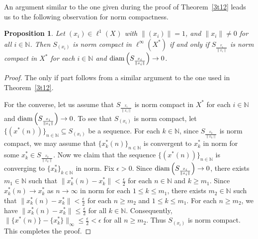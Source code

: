 \documentclass[12pt]{amsart}
\newtheorem{proposition}[theorem]{Proposition}
\theoremstyle{definition}
\numberwithin{equation}{section}
\begin{document}
 An argument similar to the one given during the proof of Theorem~\ref{3t12} leads us to the following observation for norm compactness.
\begin{proposition}\label{3c4}
Let $ (x_i) \in {{\ell^{1}}}(X_{})$ with $ \| (x_i) \| = 1 $, and $ \|x_{i}\|\neq 0$ for all $i\in{\mathbb{N}}$. Then $S_{(x_i)}$ is norm compact in $ {{\ell^{\infty}}}(X_{}^*) $ if and only if $S_{\frac{x_i}{\|x_i\|}} $ is norm compact in $X_{}^*$ for each $i\in{\mathbb{N}}$ and $ \textup{diam}\left(S_{\frac{x_i}{\|x_i\|}}\right) \to 0 $.
\end{proposition}

\begin{proof}
 The only if part follows from a similar argument to the one  used in Theorem~\ref{3t12}.

For the converse, let us assume that $S_{\frac{x_i}{\|x_i\|}} $ is norm compact in $X_{}^*$ for each $i\in{\mathbb{N}}$ and  $\textup{diam}\left(S_{\frac{x_i}{\|x_i\|}}\right) \to 0$. To see that  $S_{(x_i)}$ is norm compact, let $\{(x^*(n))\}_{n\in\mathbb{N}} \subseteq S_{(x_i)}$ be a sequence. For each $k\in \mathbb{N}$, since $S_{\frac{x_k}{\|x_k\|}}$ is norm compact, we may assume that $\{x^*_{k}(n)\}_{n\in \mathbb{N}}$ is convergent to $x_{k}^*$ in norm for some $x_{k}^*\in S_{\frac{x_{k}}{\|x_{k}\|}}$. Now we claim that the sequence $\{(x^*(n))\}_{n\in\mathbb{N}}$ is converging to $\{x_{k}^*\}_{k\in\mathbb{N}}$ in norm. Fix $\epsilon>0$. Since $\textup{diam}\left(S_{\frac{x_i}{\|x_i\|}}\right) \to 0$, there exists  $m_{1}\in \mathbb{N}$ such that $\|x_{k}^*(n)-x_{k}^*\|<\frac{\epsilon}{2}$ for each $n\in \mathbb{N}$ and $k\geq m_{1}$. Since $x_{k}^*(n)\to x_{k}^*$ as $n\to \infty$ in norm for each $1\leq k\leq m_{1}$, there exists $m_{2}\in\mathbb{N}$ such that $\|x_{k}^*(n)-x_{k}^*\|<\frac{\epsilon}{2}$ for each $n\geq m_{2}$ and $1\leq k\leq m_{1}$. For each $n\geq m_{2}$, we have $\|x_{k}^*(n)-x_{k}^*\|\leq \frac{\epsilon}{2}$ for all $k\in \mathbb{N}$. Consequently, $\|\{x^*(n)\}-\{x_{k}^*\}\|_{\infty}\leq \frac{\epsilon}{2}<\epsilon$ for all $n\geq m_{2}$. Thus $S_{(x_{i})}$ is norm compact. This completes the proof.
\end{proof}
\end{document}
